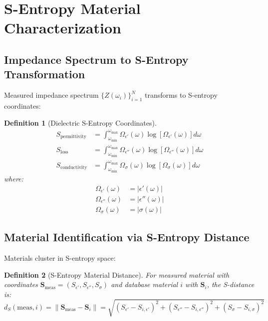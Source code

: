 \documentclass[12pt,a4paper]{article}
\newtheorem{definition}{Definition}
\begin{document}
\section{S-Entropy Material Characterization}

\subsection{Impedance Spectrum to S-Entropy Transformation}

Measured impedance spectrum $\{Z(\omega_i)\}_{i=1}^{N}$ transforms to S-entropy coordinates:

\begin{definition}[Dielectric S-Entropy Coordinates]
\begin{align}
S_{\text{permittivity}} &= \int_{\omega_{\text{min}}}^{\omega_{\text{max}}} \Omega_{\epsilon'}(\omega) \log[\Omega_{\epsilon'}(\omega)] d\omega \\
S_{\text{loss}} &= \int_{\omega_{\text{min}}}^{\omega_{\text{max}}} \Omega_{\epsilon''}(\omega) \log[\Omega_{\epsilon''}(\omega)] d\omega \\
S_{\text{conductivity}} &= \int_{\omega_{\text{min}}}^{\omega_{\text{max}}} \Omega_{\sigma}(\omega) \log[\Omega_{\sigma}(\omega)] d\omega
\end{align}
where:
\begin{align}
\Omega_{\epsilon'}(\omega) &= |\epsilon'(\omega)| \\
\Omega_{\epsilon''}(\omega) &= |\epsilon''(\omega)| \\
\Omega_{\sigma}(\omega) &= |\sigma(\omega)|
\end{align}
\end{definition}

\subsection{Material Identification via S-Entropy Distance}

Materials cluster in S-entropy space:

\begin{definition}[S-Entropy Material Distance]
For measured material with coordinates $\mathbf{S}_{\text{meas}} = (S_{\epsilon'}, S_{\epsilon''}, S_{\sigma})$ and database material $i$ with $\mathbf{S}_i$, the S-distance is:
\begin{equation}
d_S(\text{meas}, i) = \|\mathbf{S}_{\text{meas}} - \mathbf{S}_i\| = \sqrt{(S_{\epsilon'} - S_{i,\epsilon'})^2 + (S_{\epsilon''} - S_{i,\epsilon''})^2 + (S_{\sigma} - S_{i,\sigma})^2}
\end{equation}
\end{definition}
\end{document}
